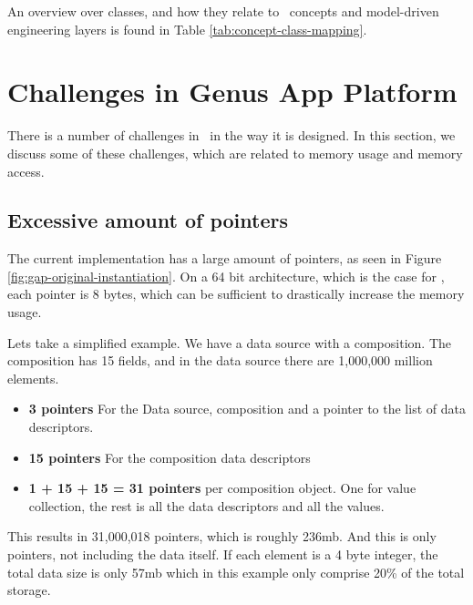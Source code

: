 An overview over classes, and how they relate to \gap~concepts and model-driven engineering layers is found in Table \ref{tab:concept-class-mapping}.

\section{Challenges in Genus App Platform}
\label{sec:Challenges in Genus App Platform}
There is a number of challenges in \gap~in the way it is designed. In this section, we discuss some of these challenges, which are related to memory usage and memory access.

\subsection{Excessive amount of pointers}
\label{sub:Excessive amount of pointers}
The current implementation has a large amount of pointers, as seen in Figure \ref{fig:gap-original-instantiation}. On a 64 bit architecture, which is the case for \gap, each pointer is 8 bytes, which can be sufficient to drastically increase the memory usage.

Lets take a simplified example. We have a data source with a composition. The composition has 15 fields, and in the data source there are 1,000,000 million elements.
\begin{itemize}
    \item \textbf{3 pointers} For the Data source, composition and a pointer to the list of data descriptors.
    \item \textbf{15 pointers} For the composition data descriptors
    \item \textbf{1 + 15 + 15 = 31 pointers} per composition object. One for value collection, the rest is all the data descriptors and all the values.
\end{itemize}

This results in 31,000,018 pointers, which is roughly 236mb. And this is only pointers, not including the data itself. If each element is a 4 byte integer, the total data size is only 57mb which in this example only comprise 20\% of the total storage.

